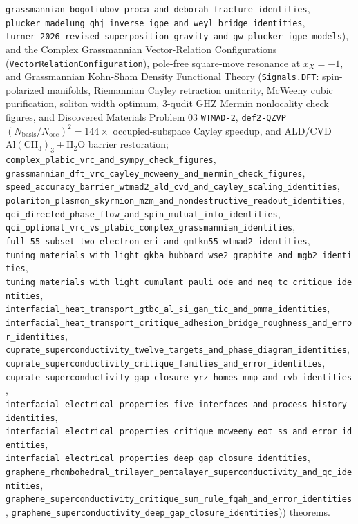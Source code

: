 \texttt{grassmannian\_bogoliubov\_proca\_and\_deborah\_fracture\_identities},
\texttt{plucker\_madelung\_qhj\_inverse\_igpe\_and\_weyl\_bridge\_identities},
\texttt{turner\_2026\_revised\_superposition\_gravity\_and\_gw\_plucker\_igpe\_models}),
and the Complex Grassmannian Vector-Relation Configurations (\texttt{VectorRelationConfiguration}),
pole-free square-move resonance at $x_X=-1$, and Grassmannian Kohn-Sham Density
Functional Theory (\texttt{Signals.DFT}: spin-polarized manifolds, Riemannian Cayley
retraction unitarity, McWeeny cubic purification, soliton width optimum,
3-qudit GHZ Mermin nonlocality check figures, and Discovered Materials Problem 03
\texttt{WTMAD-2}, \texttt{def2-QZVP} $(N_{\mathrm{basis}}/N_{\mathrm{occ}})^2 = 144\times$
occupied-subspace Cayley speedup, and ALD/CVD $\mathrm{Al(CH_3)_3 + H_2O}$ barrier
restoration;
\texttt{complex\_plabic\_vrc\_and\_sympy\_check\_figures},
\texttt{grassmannian\_dft\_vrc\_cayley\_mcweeny\_and\_mermin\_check\_figures},
\texttt{speed\_accuracy\_barrier\_wtmad2\_ald\_cvd\_and\_cayley\_scaling\_identities},
\texttt{polariton\_plasmon\_skyrmion\_mzm\_and\_nondestructive\_readout\_identities},
\texttt{qci\_directed\_phase\_flow\_and\_spin\_mutual\_info\_identities},
\texttt{qci\_optional\_vrc\_vs\_plabic\_complex\_grassmannian\_identities},
\texttt{full\_55\_subset\_two\_electron\_eri\_and\_gmtkn55\_wtmad2\_identities},
\texttt{tuning\_materials\_with\_light\_gkba\_hubbard\_wse2\_graphite\_and\_mgb2\_identities},
\texttt{tuning\_materials\_with\_light\_cumulant\_pauli\_ode\_and\_neq\_tc\_critique\_identities},
\texttt{interfacial\_heat\_transport\_gtbc\_al\_si\_gan\_tic\_and\_pmma\_identities},
\texttt{interfacial\_heat\_transport\_critique\_adhesion\_bridge\_roughness\_and\_error\_identities},
\texttt{cuprate\_superconductivity\_twelve\_targets\_and\_phase\_diagram\_identities},
\texttt{cuprate\_superconductivity\_critique\_families\_and\_error\_identities},
\texttt{cuprate\_superconductivity\_gap\_closure\_yrz\_homes\_mmp\_and\_rvb\_identities},
\texttt{interfacial\_electrical\_properties\_five\_interfaces\_and\_process\_history\_identities},
\texttt{interfacial\_electrical\_properties\_critique\_mcweeny\_eot\_ss\_and\_error\_identities},
\texttt{interfacial\_electrical\_properties\_deep\_gap\_closure\_identities},
\texttt{graphene\_rhombohedral\_trilayer\_pentalayer\_superconductivity\_and\_qc\_identities},
\texttt{graphene\_superconductivity\_critique\_sum\_rule\_fqah\_and\_error\_identities},
\texttt{graphene\_superconductivity\_deep\_gap\_closure\_identities})) theorems.

